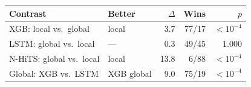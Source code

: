 \footnotesize
\begin{tabular}{llrrr}
\toprule
Contrast & Better & $\Delta$ & Wins & $p$ \\
\midrule
XGB: local vs.\ global & local & 3.7 & 77/17 & $<10^{-4}$ \\
LSTM: global vs.\ local & --- & 0.3 & 49/45 & $1.000$ \\
N-HiTS: global vs.\ local & local & 13.8 & 6/88 & $<10^{-4}$ \\
Global: XGB vs.\ LSTM & XGB global & 9.0 & 75/19 & $<10^{-4}$ \\
\bottomrule
\end{tabular}